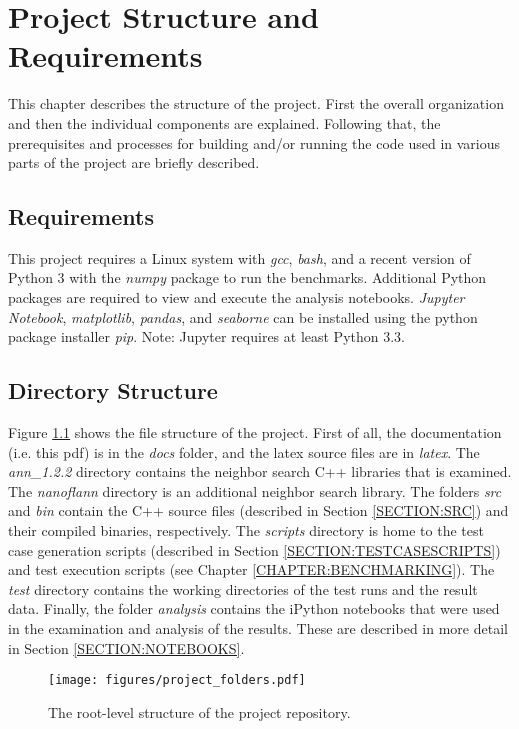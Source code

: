 
\chapter{Project Structure and Requirements}

This chapter describes the structure of the project. First the overall organization and then the individual components are explained. Following that, the prerequisites and processes for building and/or running the code used in various parts of the project are briefly described.

\section{Requirements}
\label{SECTION:REQS}
This project requires a Linux system with {\itshape gcc}, {\itshape bash}, and a recent version of Python 3 with the {\itshape numpy} package to run the benchmarks. Additional Python packages are required to view and execute the analysis notebooks. {\itshape Jupyter Notebook}, {\itshape matplotlib},  {\itshape pandas}, and {\itshape seaborne} can be installed using the python package installer {\itshape pip}. Note: Jupyter requires at least Python 3.3.

\section{Directory Structure}
Figure \ref{FIG:folders} shows the file structure of the project.  First of all, the documentation (i.e.  this pdf) is in the {\itshape docs} folder, and the latex source files are in {\itshape latex}. The {\itshape ann\_1.2.2} directory contains the neighbor search C++ libraries that is examined. The {\itshape nanoflann} directory is an additional neighbor search library.  The folders {\itshape src} and {\itshape bin} contain the C++ source files (described in Section \ref{SECTION:SRC}) and their compiled binaries, respectively.  The {\itshape scripts} directory is home to the test case generation scripts (described in Section \ref{SECTION:TESTCASESCRIPTS}) and test execution scripts (see Chapter \ref{CHAPTER:BENCHMARKING}).  The {\itshape test} directory contains the working directories of the test runs and the result data.   Finally, the folder {\itshape analysis} contains the iPython notebooks that were used in the examination and analysis of the results.  These are described in more detail in Section \ref{SECTION:NOTEBOOKS}.

\begin{figure}[h]
	\centering
	\texttt{[image: figures/project\_folders.pdf]}
	\caption{The root-level structure of the project repository.}
      \label{FIG:folders}
\end{figure}

